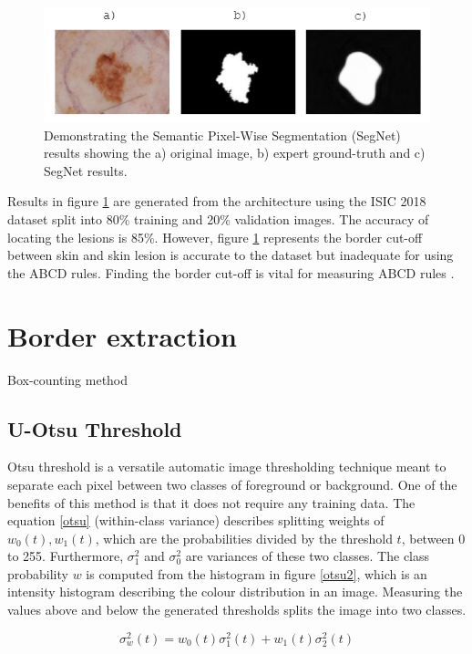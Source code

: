 \begin{figure}[hb]
\centering
\includegraphics[scale=1.2]{images/border-seg.png}
\caption{Demonstrating the Semantic Pixel-Wise Segmentation (SegNet) results showing the a) original image, b) expert ground-truth and c) SegNet results.} \label{SegNet}
\end{figure}

Results in figure \ref{SegNet} are generated from the architecture using the ISIC 2018 dataset split into 80\% training and 20\% validation images. The accuracy of locating the lesions is 85\%. However, figure \ref{SegNet} represents the border cut-off between skin and skin lesion is accurate to the dataset but inadequate for using the ABCD rules. Finding the border cut-off is vital for measuring ABCD rules \cite{Pereira2020}.

\section{Border extraction}
Box-counting method

\subsection{U-Otsu Threshold}
Otsu threshold is a versatile automatic image thresholding technique meant to separate each pixel between two classes of foreground or background. One of the benefits of this method is that it does not require any training data. The equation \ref{otsu} (within-class variance) describes splitting weights of $w_0(t),w_1(t)$, which are the probabilities divided by the threshold $t$, between 0 to 255. Furthermore, $\sigma_1^2$ and $\sigma_0^2$ are variances of these two classes. The class probability $w$ is computed from the histogram in figure \ref{otsu2}, which is an intensity histogram describing the colour distribution in an image. Measuring the values above and below the generated thresholds splits the image into two classes.

\begin{equation} \label{otsu}
\sigma_w^2(t) = w_0(t)\sigma_1^2(t) + w_1(t)\sigma_2^2(t)
\end{equation}

